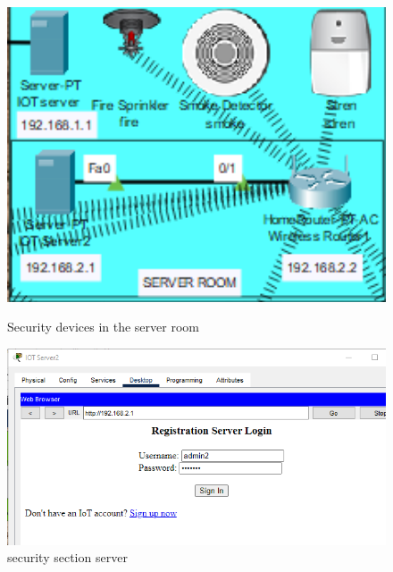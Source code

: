 \documentclass{report}
\begin{document}
\begin{figure}[h]
    \vspace{0.5cm}
    \begin{minipage}{0.45\textwidth}
    \centering
    \includegraphics[width=1\textwidth]{As/1c.png}
    \caption{Security devices in the server room}
    \label{fig:12}
    \end{minipage}
    \hfill
    \begin{minipage}{0.45\textwidth}
    \centering
    \includegraphics[width=1\textwidth]{As/2c.png}
    \caption{security section server}
    \label{fig:13}
    \end{minipage}


\end{figure}
\end{document}
